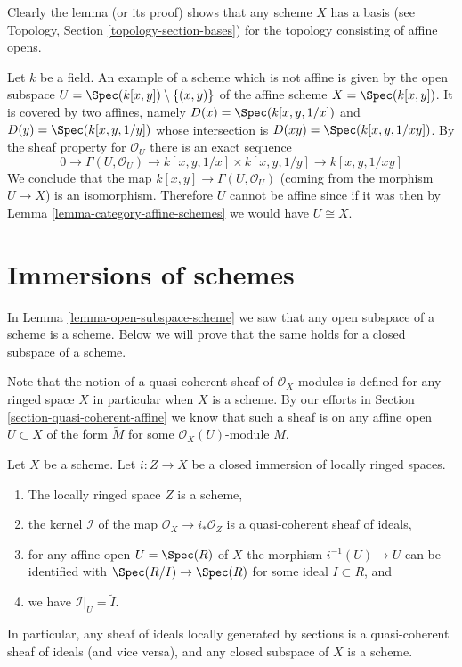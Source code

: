 \noindent
Clearly the lemma (or its proof) shows that any scheme
$X$ has a basis (see Topology, Section \ref{topology-section-bases})
for the topology consisting of affine opens.

\begin{example}
\label{example-not-affine}
Let $k$ be a field.
An example of a scheme which is not affine is
given by the open subspace
$U = \Spec(k[x, y]) \setminus \{ (x, y)\}$
of the affine scheme $X =\Spec(k[x, y])$.
It is covered by two affines, namely $D(x) = \Spec(k[x, y, 1/x])$
and $D(y) = \Spec(k[x, y, 1/y])$ whose intersection is
$D(xy) = \Spec(k[x, y, 1/xy])$. By the sheaf property
for $\mathcal{O}_U$ there is an exact sequence
$$
0 \to
\Gamma(U, \mathcal{O}_U) \to
k[x, y, 1/x] \times k[x, y, 1/y] \to
k[x, y, 1/xy]
$$
We conclude that the map $k[x, y] \to \Gamma(U, \mathcal{O}_U)$
(coming from the morphism $U \to X$) is an isomorphism.
Therefore $U$ cannot be affine since if it was then by
Lemma \ref{lemma-category-affine-schemes} we would have $U \cong X$.
\end{example}











\section{Immersions of schemes}
\label{section-immersions}

\noindent
In Lemma \ref{lemma-open-subspace-scheme} we saw that any open subspace
of a scheme is a scheme. Below we will prove that the same holds for
a closed subspace of a scheme.

\medskip\noindent
Note that the notion of a quasi-coherent sheaf of $\mathcal{O}_X$-modules
is defined for any ringed space $X$ in particular when $X$ is a scheme.
By our efforts in Section \ref{section-quasi-coherent-affine} we
know that such a sheaf is on any affine open $U \subset X$
of the form $\widetilde M$ for some $\mathcal{O}_X(U)$-module $M$.

\begin{lemma}
\label{lemma-closed-subspace-scheme}
Let $X$ be a scheme. Let $i : Z \to X$ be a closed immersion
of locally ringed spaces.
\begin{enumerate}
\item The locally ringed space $Z$ is a scheme,
\item the kernel $\mathcal{I}$ of the map
$\mathcal{O}_X \to i_*\mathcal{O}_Z$ is a quasi-coherent
sheaf of ideals,
\item for any affine open $U = \Spec(R)$ of $X$
the morphism $i^{-1}(U) \to U$ can be identified with
$\Spec(R/I) \to \Spec(R)$ for some ideal $I \subset R$, and
\item we have $\mathcal{I}|_U = \widetilde I$.
\end{enumerate}
In particular, any sheaf of ideals locally generated by sections
is a quasi-coherent sheaf of ideals (and vice versa),
and any closed subspace of $X$ is a scheme.
\end{lemma}

